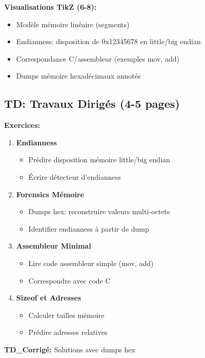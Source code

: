 \documentclass[10pt,a4paper]{article}
\begin{document}
\textbf{Visualisations TikZ (6-8):}
\begin{itemize}
\item Modèle mémoire linéaire (segments)
\item Endianness: disposition de 0x12345678 en little/big endian
\item Correspondance C/assembleur (exemples mov, add)
\item Dumps mémoire hexadécimaux annotés
\end{itemize}

\subsection*{TD: Travaux Dirigés (4-5 pages)}

\textbf{Exercices:}
\begin{enumerate}
\item \textbf{Endianness}
   \begin{itemize}
   \item Prédire disposition mémoire little/big endian
   \item Écrire détecteur d'endianness
   \end{itemize}

\item \textbf{Forensics Mémoire}
   \begin{itemize}
   \item Dumps hex: reconstruire valeurs multi-octets
   \item Identifier endianness à partir de dump
   \end{itemize}

\item \textbf{Assembleur Minimal}
   \begin{itemize}
   \item Lire code assembleur simple (mov, add)
   \item Correspondre avec code C
   \end{itemize}

\item \textbf{Sizeof et Adresses}
   \begin{itemize}
   \item Calculer tailles mémoire
   \item Prédire adresses relatives
   \end{itemize}
\end{enumerate}

\textbf{TD\_Corrigé:} Solutions avec dumps hex
\end{document}
